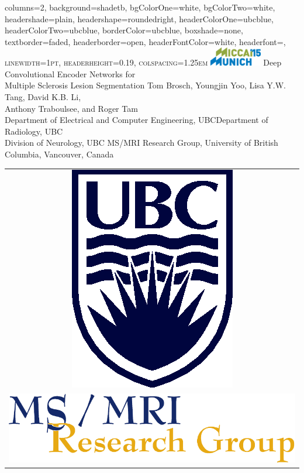 \documentclass[%
portrait,paperwidth=841mm,paperheight=1180mm,%
margin=2cm,
fontscale=0.32
]{baposter}
\begin{document}
\begin{poster}{
  columns=2,
  background=shadetb,
  bgColorOne=white,
  bgColorTwo=white,
  headershade=plain,
  headershape=roundedright,
  headerColorOne=ubcblue,
  headerColorTwo=ubcblue,
  borderColor=ubcblue,
  boxshade=none,
  textborder=faded,
  headerborder=open,
  headerFontColor=white,
  headerfont=\scshape\Large,
  linewidth=1pt,
  headerheight=0.19\textwidth,
  colspacing=1.25em
}
{
\includegraphics[width=0.17\textwidth]{images/Logo_MICCAI15}
}
{
Deep Convolutional Encoder Networks for\\ Multiple Sclerosis Lesion
Segmentation\vspace{0.5em} }
{
\Large
Tom Brosch,
Youngjin Yoo,
Lisa Y.W. Tang,
David K.B. Li,\\
Anthony Traboulsee, and
Roger Tam\\[0.65ex]
\normalsize {}Department of Electrical and Computer Engineering,
UBC\quad {}Department of Radiology, UBC\\[0.65ex]
Division of Neurology, UBC\quad
{}MS/MRI Research Group, University of British Columbia, Vancouver, Canada
}
{
\begin{tabular}{c}
\\
\includegraphics[height=0.08\textwidth]{images/s4b282c}\\
\addlinespace
\includegraphics[height=0.04\textwidth]{images/msmri_simple}
\end{tabular}
}


\end{poster}
\end{document}
